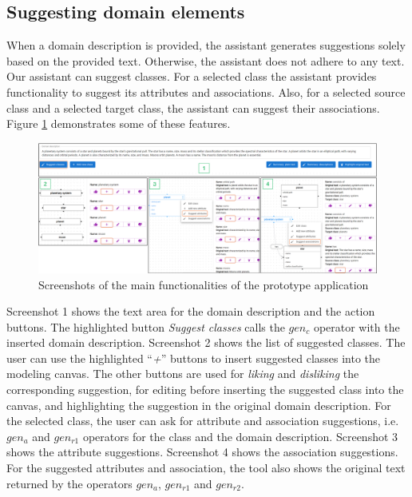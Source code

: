 \subsection{Suggesting domain elements}

When a domain description is provided, the assistant generates suggestions solely based on the provided text. Otherwise, the assistant does not adhere to any text. Our assistant can suggest classes. For a selected class the assistant provides functionality to suggest its attributes and associations. Also, for a selected source class and a selected target class, the assistant can suggest their associations. Figure \ref{fig:assistant-features} demonstrates some of these features.

\begin{figure}[!h]
    \centering
    \includegraphics[scale=0.22]{img/assistant-features.png}
    \caption{\centering Screenshots of the main functionalities of the prototype application}
    \label{fig:assistant-features}
\end{figure}

Screenshot 1 shows the text area for the domain description and the action buttons. The highlighted button \textit{Suggest classes} calls the $gen_c$ operator with the inserted domain description. Screenshot 2 shows the list of suggested classes. The user can use the highlighted ``\textit{+}'' buttons to insert suggested classes into the modeling canvas. The other buttons are used for \textit{liking} and \textit{disliking} the corresponding suggestion, for editing before inserting the suggested class into the canvas, and highlighting the suggestion in the original domain description. For the selected class, the user can ask for attribute and association suggestions, i.e. $gen_a$ and $gen_{r1}$ operators for the class and the domain description. Screenshot 3 shows the attribute suggestions. Screenshot 4 shows the association suggestions. For the suggested attributes and association, the tool also shows the original text returned by the operators $gen_a$, $gen_{r1}$ and $gen_{r2}$.


